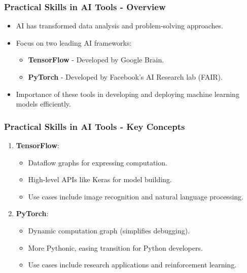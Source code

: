\documentclass[aspectratio=169]{beamer}
\begin{document}
\begin{frame}[fragile]
    \frametitle{Practical Skills in AI Tools - Overview}
    \begin{itemize}
        \item AI has transformed data analysis and problem-solving approaches.
        \item Focus on two leading AI frameworks: 
        \begin{itemize}
            \item \textbf{TensorFlow} - Developed by Google Brain.
            \item \textbf{PyTorch} - Developed by Facebook’s AI Research lab (FAIR).
        \end{itemize}
        \item Importance of these tools in developing and deploying machine learning models efficiently.
    \end{itemize}
\end{frame}

\begin{frame}[fragile]
    \frametitle{Practical Skills in AI Tools - Key Concepts}
    \begin{enumerate}
        \item \textbf{TensorFlow}:
            \begin{itemize}
                \item Dataflow graphs for expressing computation.
                \item High-level APIs like Keras for model building.
                \item Use cases include image recognition and natural language processing.
            \end{itemize}
        
        \item \textbf{PyTorch}:
            \begin{itemize}
                \item Dynamic computation graph (simplifies debugging).
                \item More Pythonic, easing transition for Python developers.
                \item Use cases include research applications and reinforcement learning.
            \end{itemize}
    \end{enumerate}
\end{frame}
\end{document}

